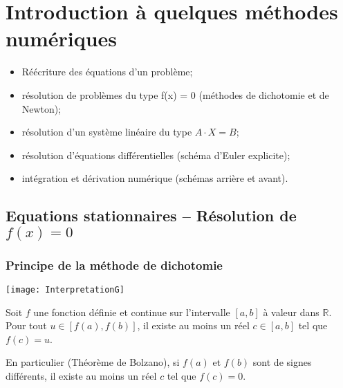 \setchapterpreamble[u]{\margintoc}

\chapter{Introduction à quelques méthodes numériques}


%

\begin{obj}
\begin{itemize}
\item Réécriture des équations d'un problème;
\item résolution de problèmes du type f(x) = 0 (méthodes de dichotomie et de Newton);
\item résolution d'un système linéaire du type $A\cdot X = B$;
\item résolution d'équations différentielles (schéma d'Euler explicite);
\item intégration et dérivation numérique (schémas arrière et avant).
\end{itemize}
\end{obj}



\section{Equations stationnaires -- Résolution de $f(x)=0$}

\subsection{Principe de la méthode de dichotomie}

\begin{marginfigure}
\texttt{[image: InterpretationG]}
\end{marginfigure}

\begin{theoreme}

Soit $f$ une fonction définie et continue sur l'intervalle $[a,b]$ à valeur dans $\mathbb{R}$. Pour tout $u\in[f(a),f(b)]$, il existe au moins un réel $c\in [a,b]$  tel que $f(c)=u$.

 En particulier (Théorème de Bolzano), si $f(a)$ et $f(b)$ sont de signes différents, il existe au moins un réel $c$ tel que $f(c)=0$. 
\end{theoreme}


